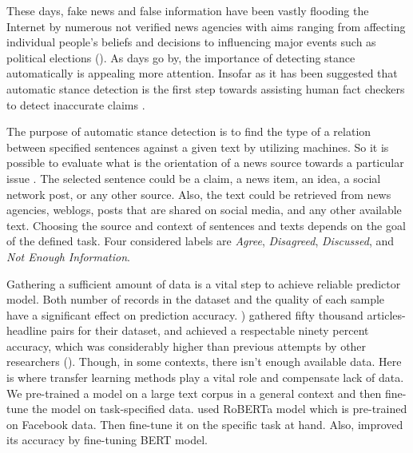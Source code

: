 These days, fake news and false information have been vastly flooding the Internet by numerous not verified news agencies with aims ranging from affecting individual people’s beliefs and decisions to influencing major events such as political elections (\cite{memory_network}). As days go by, the importance of detecting stance automatically is appealing more attention. Insofar as it has been suggested that automatic stance detection is the first step towards assisting human fact checkers to detect inaccurate claims \cite{UCLMR}.



The purpose of automatic stance detection is to find the type of a relation between specified sentences against a given text by utilizing machines. So it is possible to evaluate what is the orientation of a news source towards a particular issue \cite{UCLMR}. The selected sentence could be a claim, a news item, an idea, a social network post, or any other source. Also, the text could be retrieved from news agencies, weblogs, posts that are shared on social media, and any other available text. Choosing the source and context of sentences and texts depends on the goal of the defined task. Four considered labels are \textit{Agree}, \textit{Disagreed}, \textit{Discussed}, and \textit{Not Enough Information}. 

Gathering a sufficient amount of data is a vital step to achieve reliable predictor model. Both number of records in the dataset and the quality of each sample have a significant effect on prediction accuracy. \cite{takestancefake}) gathered fifty thousand articles-headline pairs for their dataset, and achieved a respectable ninety percent accuracy, which was considerably higher than previous attempts by other researchers (\cite{book_fake}). Though, in some contexts, there isn't enough available data. Here is where transfer learning methods play a vital role and compensate lack of data. We pre-trained a model on a large text corpus in a general context and then fine-tune the model on task-specified data. \cite{takestancefake} used RoBERTa model which is pre-trained on Facebook data. Then fine-tune it on the specific task at hand.
Also, \cite{stance_robust} improved its accuracy by fine-tuning BERT model.

